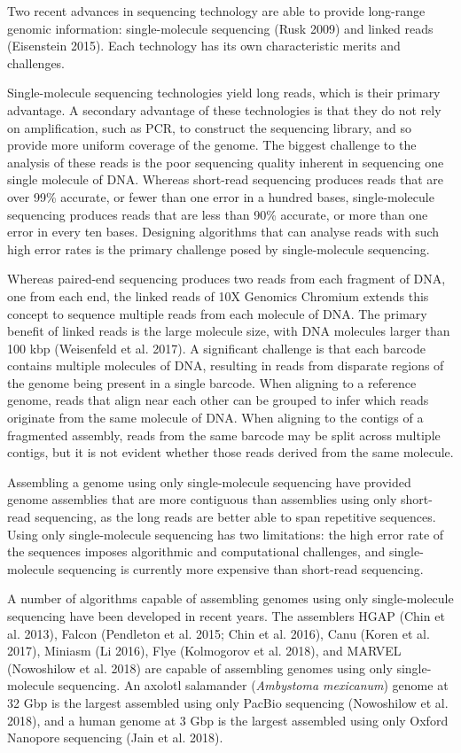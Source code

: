 \documentclass[
  12pt,
  oneside,
  openany]{book}
\begin{document}
Two recent advances in sequencing technology are able to provide long-range genomic information: single-molecule sequencing (Rusk 2009) and linked reads (Eisenstein 2015). Each technology has its own characteristic merits and challenges.

Single-molecule sequencing technologies yield long reads, which is their primary advantage. A secondary advantage of these technologies is that they do not rely on amplification, such as PCR, to construct the sequencing library, and so provide more uniform coverage of the genome. The biggest challenge to the analysis of these reads is the poor sequencing quality inherent in sequencing one single molecule of DNA. Whereas short-read sequencing produces reads that are over 99\% accurate, or fewer than one error in a hundred bases, single-molecule sequencing produces reads that are less than 90\% accurate, or more than one error in every ten bases. Designing algorithms that can analyse reads with such high error rates is the primary challenge posed by single-molecule sequencing.

Whereas paired-end sequencing produces two reads from each fragment of DNA, one from each end, the linked reads of 10X Genomics Chromium extends this concept to sequence multiple reads from each molecule of DNA. The primary benefit of linked reads is the large molecule size, with DNA molecules larger than 100 kbp (Weisenfeld et al. 2017). A significant challenge is that each barcode contains multiple molecules of DNA, resulting in reads from disparate regions of the genome being present in a single barcode. When aligning to a reference genome, reads that align near each other can be grouped to infer which reads originate from the same molecule of DNA. When aligning to the contigs of a fragmented assembly, reads from the same barcode may be split across multiple contigs, but it is not evident whether those reads derived from the same molecule.

Assembling a genome using only single-molecule sequencing have provided genome assemblies that are more contiguous than assemblies using only short-read sequencing, as the long reads are better able to span repetitive sequences. Using only single-molecule sequencing has two limitations: the high error rate of the sequences imposes algorithmic and computational challenges, and single-molecule sequencing is currently more expensive than short-read sequencing.

A number of algorithms capable of assembling genomes using only single-molecule sequencing have been developed in recent years. The assemblers HGAP (Chin et al. 2013), Falcon (Pendleton et al. 2015; Chin et al. 2016), Canu (Koren et al. 2017), Miniasm (Li 2016), Flye (Kolmogorov et al. 2018), and MARVEL (Nowoshilow et al. 2018) are capable of assembling genomes using only single-molecule sequencing. An axolotl salamander (\emph{Ambystoma mexicanum}) genome at 32 Gbp is the largest assembled using only PacBio sequencing (Nowoshilow et al. 2018), and a human genome at 3 Gbp is the largest assembled using only Oxford Nanopore sequencing (Jain et al. 2018).
\end{document}
